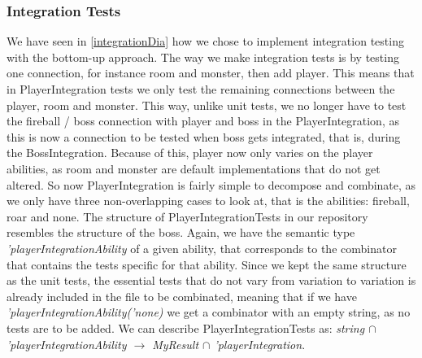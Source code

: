 \subsubsection{Integration Tests} \label{integrationTests}
We have seen in \autoref{integrationDia} how we chose to implement integration testing with the bottom-up approach. The way we make integration tests is by testing one connection, for instance room and monster, then add player. This means that in PlayerIntegration tests we only test the remaining connections between the player, room and monster. This way, unlike unit tests, we no longer have to test the fireball / boss connection with player and boss in the PlayerIntegration, as this is now a connection to be tested when boss gets integrated, that is, during the BossIntegration. Because of this, player now only varies on the player abilities, as room and monster are default implementations that do not get altered. So now PlayerIntegration is fairly simple to decompose and combinate, as we only have three non-overlapping cases to look at, that is the abilities: fireball, roar and none. The structure of PlayerIntegrationTests in our repository resembles the structure of the boss. Again, we have the semantic type \textit{'playerIntegrationAbility} of a given ability, that corresponds to the combinator that contains the tests specific for that ability. Since we kept the same structure as the unit tests, the essential tests that do not vary from variation to variation is already included in the file to be combinated, meaning that if we have \textit{'playerIntegrationAbility('none)} we get a combinator with an empty string, as no tests are to be added. We can describe PlayerIntegrationTests as: \textit{string $\cap$ 'playerIntegrationAbility $\to$ MyResult $\cap$ 'playerIntegration}. \\
